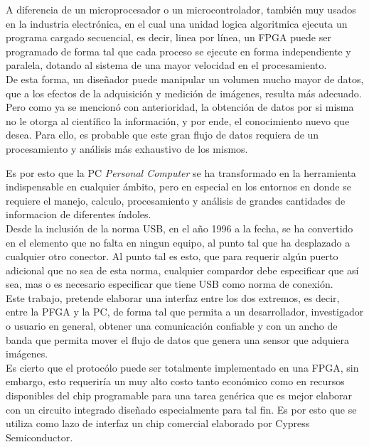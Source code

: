 A diferencia de un microprocesador o un microcontrolador, también muy usados en la industria electrónica, en el cual una unidad logica algoritmica ejecuta un programa cargado secuencial, es decir, linea por línea, un FPGA puede ser programado de forma tal que cada proceso se ejecute en forma independiente y paralela, dotando al sistema de una mayor velocidad en el procesamiento.\\

De esta forma, un diseñador puede manipular un volumen mucho mayor de datos, que a los efectos de la adquisición y medición de imágenes, resulta más adecuado.\\

Pero como ya se mencionó con anterioridad, la obtención de datos por si misma no le otorga al científico la información, y por ende, el conocimiento nuevo que desea. Para ello, es probable que este gran flujo de datos requiera de un procesamiento y análisis más exhaustivo de los mismos.

Es por esto que la PC {\it Personal Computer} se ha transformado en la herramienta indispensable en cualquier ámbito, pero en especial en los entornos en donde se requiere el  manejo, calculo, procesamiento y análisis de grandes cantidades de informacion de diferentes índoles.\\

Desde la inclusión de la norma USB, en el año 1996 a la fecha, se ha convertido en el elemento que no falta en ningun equipo, al punto tal que ha desplazado a cualquier otro conector. Al punto tal es esto, que para requerir algún puerto adicional que no sea de esta norma, cualquier compardor debe especificar que así sea, mas o es necesario especificar que tiene USB como norma de conexión.\\

Este trabajo, pretende elaborar una interfaz entre los dos extremos, es decir, entre la PFGA y la PC, de forma tal que permita a un desarrollador, investigador o usuario en general, obtener una comunicación confiable y con un ancho de banda que permita mover el flujo de datos que genera una sensor que adquiera imágenes.\\

Es cierto que el protocólo puede ser totalmente implementado en una FPGA, sin embargo, esto requeriría un muy alto costo tanto económico como en recursos disponibles del chip programable para una tarea genérica que es mejor elaborar con un circuito integrado diseñado especialmente para tal fin. Es por esto que se utiliza como lazo de interfaz un chip comercial elaborado por Cypress Semiconductor.\\



